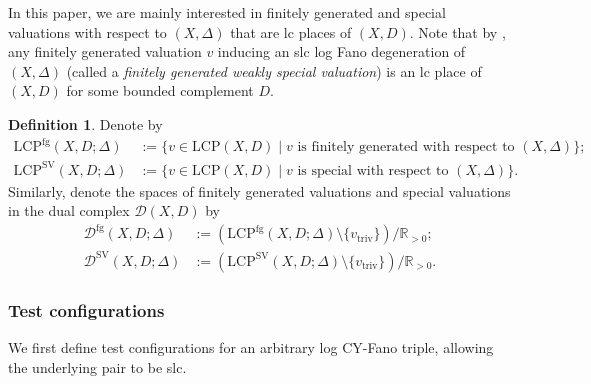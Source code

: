 \documentclass[reqno, 12pt]{amsart}
\theoremstyle{definition}
\newtheorem{defn}[prop]{Definition}
\newcommand{\bR}{\mathbb{R}}
\newcommand{\cD}{\mathcal{D}}
\newcommand{\triv}{\mathrm{triv}}
\newcommand{\SV}{\mathrm{SV}}
\newcommand{\rfg}{\mathrm{fg}}
\newcommand{\LCP}{\mathrm{LCP}}
\numberwithin{equation}{section}
\begin{document}
In this paper, we are mainly interested in finitely generated and special valuations with respect to $(X,\Delta)$ that are lc places of $(X,D)$. Note that by \cite[Appendix]{BLX22}, any finitely generated valuation $v$ inducing an slc log Fano degeneration of $(X,\Delta)$ (called a \emph{finitely generated weakly special valuation}) is an lc place of $(X,D)$ for some bounded complement $D$. 

\begin{defn}
Denote by 
\begin{align*}
\LCP^{\rfg}(X,D;\Delta)&:= \{v\in \LCP(X,D)\mid v\textrm{ is finitely generated with respect to }(X,\Delta)\};\\
\LCP^{\SV}(X,D;\Delta)&:= \{v\in \LCP(X,D)\mid v\textrm{ is special with respect to }(X,\Delta)\}.
\end{align*}
Similarly, denote the spaces of finitely generated valuations and special valuations in the dual complex $\cD(X,D)$ by
\begin{align*}
\cD^{\rfg}(X,D;\Delta)&:=(\LCP^{\rfg}(X,D;\Delta)\setminus \{v_{\triv}\})/\bR_{>0};\\ \cD^{\SV}(X,D;\Delta)&:=(\LCP^{\SV}(X,D;\Delta)\setminus \{v_{\triv}\})/\bR_{>0}.
\end{align*}
\end{defn}

\subsubsection{Test configurations}

We first define test configurations for an arbitrary log CY-Fano triple, allowing the underlying pair to be slc.
\end{document}
